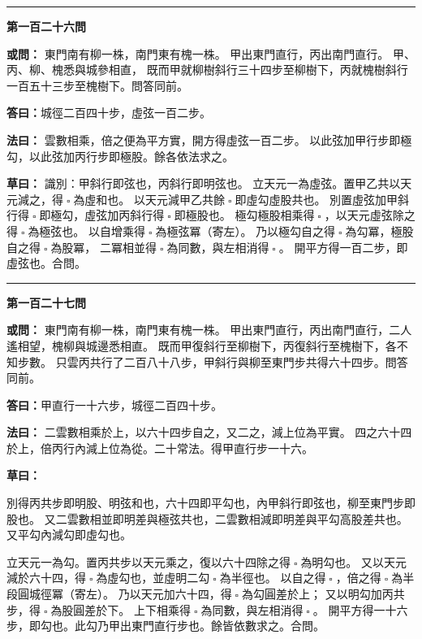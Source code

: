 \documentclass[11pt,a4paper]{article}
\let\origsquare\square
\renewcommand{\square}{\ensuremath{\origsquare}}%
\newcommand{\longline}{\noindent\rule{\textwidth}{0.4pt}}
\newcommand{\owen}[1]{%
  \par\vspace{0.4em}%
  \noindent\textcolor{problemcolor}{\textbf{或問：}}{\tradfont #1}\par\nopagebreak%
}
\newcommand{\fayue}[1]{%
  \par\noindent\textcolor{methodcolor}{\textbf{法曰：}}{\tradfont #1}\par\nopagebreak%
}
\newcommand{\tsaoyue}[1]{%
  \par\noindent\textcolor{workcolor}{\textbf{草曰：}}{\tradfont #1}\par%
}
\newcommand{\dayue}[1]{%
  \par\noindent\textcolor{anscolor}{\textbf{答曰：}}{\tradfont #1}\par\nopagebreak%
}
\newcommand{\wen}[1]{\par\vspace{0.3em}\noindent\textcolor{problemcolor}{\textbf{第#1問}}\par}
\begin{document}
\vspace{0.5cm}
\begin{center}
\longline
\end{center}

\wen{一百二十六}
\owen{%
東門南有柳一株，南門東有槐一株。
甲出東門直行，丙出南門直行。
甲、丙、柳、槐悉與城參相直，
既而甲就柳樹斜行三十四步至柳樹下，丙就槐樹斜行一百五十三步至槐樹下。問答同前。}
\dayue{城徑二百四十步，虛弦一百二步。}

\fayue{%
雲數相乘，倍之便為平方實，開方得虛弦一百二步。
以此弦加甲行步即極勾，以此弦加丙行步即極股。餘各依法求之。}

\tsaoyue{%
識別：甲斜行即弦也，丙斜行即明弦也。
立天元一為虛弦。置甲乙共以天元減之，得$ \; \square \; $為虛和也。
以天元減甲乙共餘$ \; \square \; $即虛勾虛股共也。
別置虛弦加甲斜行得$ \; \square \; $即極勾，虛弦加丙斜行得$ \; \square \; $即極股也。
極勾極股相乘得$ \; \square \; $，以天元虛弦除之得$ \; \square \; $為極弦也。
以自增乘得$ \; \square \; $為極弦冪（寄左）。
乃以極勾自之得$ \; \square \; $為勾冪，極股自之得$ \; \square \; $為股冪，
二冪相並得$ \; \square \; $為同數，與左相消得$ \; \square \; $。
開平方得一百二步，即虛弦也。合問。}

\vspace{0.5cm}
\begin{center}
\longline
\end{center}

\wen{一百二十七}
\owen{%
東門南有柳一株，南門東有槐一株。
甲出東門直行，丙出南門直行，二人遙相望，槐柳與城邊悉相直。
既而甲復斜行至柳樹下，丙復斜行至槐樹下，各不知步數。
只雲丙共行了二百八十八步，甲斜行與柳至東門步共得六十四步。問答同前。}
\dayue{甲直行一十六步，城徑二百四十步。}

\fayue{%
二雲數相乘於上，以六十四步自之，又二之，減上位為平實。
四之六十四於上，倍丙行內減上位為從。二十常法。得甲直行步一十六。}

\tsaoyue{%
別得丙共步即明股、明弦和也，六十四即平勾也，內甲斜行即弦也，柳至東門步即股也。
又二雲數相並即明差與極弦共也，二雲數相減即明差與平勾高股差共也。
又平勾內減勾即虛勾也。

立天元一為勾。置丙共步以天元乘之，復以六十四除之得$ \; \square \; $為明勾也。
又以天元減於六十四，得$ \; \square \; $為虛勾也，並虛明二勾$ \; \square \; $為半徑也。
以自之得$ \; \square \; $，倍之得$ \; \square \; $為半段圓城徑冪（寄左）。
乃以天元加六十四，得$ \; \square \; $為勾圓差於上；
又以明勾加丙共步，得$ \; \square \; $為股圓差於下。
上下相乘得$ \; \square \; $為同數，與左相消得$ \; \square \; $。
開平方得一十六步，即勾也。此勾乃甲出東門直行步也。餘皆依數求之。合問。}
\end{document}
